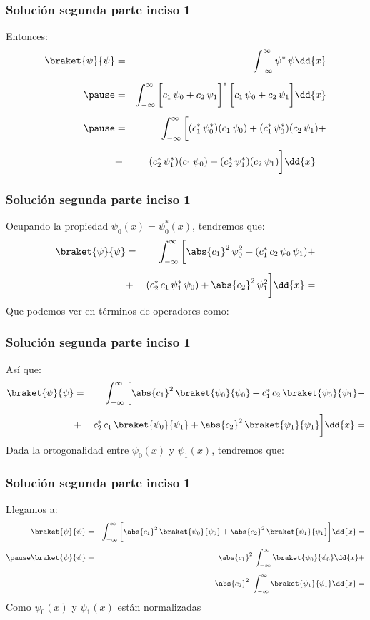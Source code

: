 \begin{frame}
\frametitle{Solución segunda parte inciso 1}
Entonces:
\begin{eqnarray*}
\braket{\psi}{\psi} &=& \int_{-\infty}^{\infty} \psi^{*} \, \psi \dd{x} \\[0.5em] \pause
&=& \int_{-\infty}^{\infty} \bigg[ c_{1} \, \psi_{0} + c_{2} \, \psi_{1} \bigg]^{*} \, \bigg[ c_{1} \, \psi_{0} + c_{2} \, \psi_{1} \bigg] \dd{x} \\[0.5em] \pause 
&=& \int_{-\infty}^{\infty} \bigg[ (c_{1}^{*} \, \psi_{0}^{*})(c_{1} \, \psi_{0}) + (c_{1}^{*} \, \psi_{0}^{*})(c_{2} \, \psi_{1}) + \\[0.5em] 
&+& (c_{2}^{*} \, \psi_{1}^{*})(c_{1} \, \psi_{0}) + (c_{2}^{*} \, \psi_{1}^{*})(c_{2} \, \psi_{1}) \bigg] \dd{x} =
\end{eqnarray*}
\end{frame}
\begin{frame}
\frametitle{Solución segunda parte inciso 1}
Ocupando la propiedad $\psi_{0}(x) = \psi_{0}^{*} (x)$, tendremos que:
\begin{eqnarray*}
\braket{\psi}{\psi} &=& \int_{-\infty}^{\infty} \bigg[ \abs{c_{1}}^{2} \, \psi_{0}^{2} + (c_{1}^{*} \, c_{2} \, \psi_{0} \, \psi_{1}) + \\[0.5em] 
&+& (c_{2}^{*} \, c_{1} \, \psi_{1}^{*} \, \psi_{0}) + \abs{c_{2}}^{2} \, \psi_{1}^{2} \bigg] \dd{x} =
\end{eqnarray*}
\pause
Que podemos ver en términos de operadores como:
\end{frame}
\begin{frame}
\frametitle{Solución segunda parte inciso 1}
Así que:
\begin{eqnarray*}
\braket{\psi}{\psi} &=& \int_{-\infty}^{\infty} \bigg[ \abs{c_{1}}^{2} \, \braket{\psi_{0}}{\psi_{0}} + c_{1}^{*} \, c_{2} \, \braket{\psi_{0}}{\psi_{1}} + \\[0.5em] 
&+& c_{2}^{*} \, c_{1} \, \braket{\psi_{0}}{\psi_{1}} + \abs{c_{2}}^{2} \, \braket{\psi_{1}}{\psi_{1}} \bigg] \dd{x}=
\end{eqnarray*}
\pause
Dada la ortogonalidad entre $\psi_{0}(x)$ y $\psi_{1}(x)$, tendremos que:
\end{frame}
\begin{frame}
\frametitle{Solución segunda parte inciso 1}
Llegamos a:
\begin{eqnarray*}
\braket{\psi}{\psi} &=& \int_{-\infty}^{\infty} \bigg[ \abs{c_{1}}^{2} \, \braket{\psi_{0}}{\psi_{0}} + \abs{c_{2}}^{2} \, \braket{\psi_{1}}{\psi_{1}} \bigg] \dd{x} = \\[0.5em] \pause
\braket{\psi}{\psi} &=&  \abs{c_{1}}^{2} \, \int_{-\infty}^{\infty} \braket{\psi_{0}}{\psi_{0}} \dd{x} + \\[0.5em]
&+& \abs{c_{2}}^{2} \, \, \int_{-\infty}^{\infty} \braket{\psi_{1}}{\psi_{1}} \dd{x} =
\end{eqnarray*}
\pause
Como $\psi_{0}(x)$ y $\psi_{1}(x)$ están normalizadas 
\end{frame}

